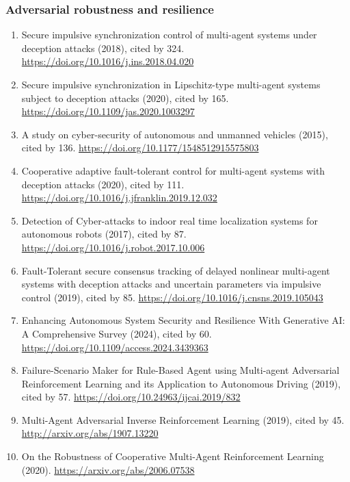 \documentclass[11pt]{article}
\begin{document}
\hypertarget{adversarial-robustness-and-resilience}{%
\subsubsection{Adversarial robustness and
resilience}\label{adversarial-robustness-and-resilience}}

\begin{enumerate}
\def\labelenumi{\arabic{enumi}.}
\tightlist
\item
  Secure impulsive synchronization control of multi-agent systems under
  deception attacks (2018), cited by 324.
  \url{https://doi.org/10.1016/j.ins.2018.04.020}
\item
  Secure impulsive synchronization in Lipschitz-type multi-agent systems
  subject to deception attacks (2020), cited by 165.
  \url{https://doi.org/10.1109/jas.2020.1003297}
\item
  A study on cyber-security of autonomous and unmanned vehicles (2015),
  cited by 136. \url{https://doi.org/10.1177/1548512915575803}
\item
  Cooperative adaptive fault-tolerant control for multi-agent systems
  with deception attacks (2020), cited by 111.
  \url{https://doi.org/10.1016/j.jfranklin.2019.12.032}
\item
  Detection of Cyber-attacks to indoor real time localization systems
  for autonomous robots (2017), cited by 87.
  \url{https://doi.org/10.1016/j.robot.2017.10.006}
\item
  Fault-Tolerant secure consensus tracking of delayed nonlinear
  multi-agent systems with deception attacks and uncertain parameters
  via impulsive control (2019), cited by 85.
  \url{https://doi.org/10.1016/j.cnsns.2019.105043}
\item
  Enhancing Autonomous System Security and Resilience With Generative
  AI: A Comprehensive Survey (2024), cited by 60.
  \url{https://doi.org/10.1109/access.2024.3439363}
\item
  Failure-Scenario Maker for Rule-Based Agent using Multi-agent
  Adversarial Reinforcement Learning and its Application to Autonomous
  Driving (2019), cited by 57.
  \url{https://doi.org/10.24963/ijcai.2019/832}
\item
  Multi-Agent Adversarial Inverse Reinforcement Learning (2019), cited
  by 45. \url{http://arxiv.org/abs/1907.13220}
\item
  On the Robustness of Cooperative Multi-Agent Reinforcement Learning
  (2020). \url{https://arxiv.org/abs/2006.07538}
\end{enumerate}
\end{document}
